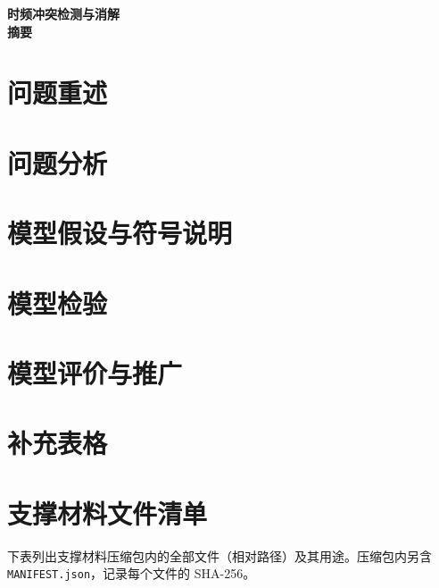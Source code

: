 \documentclass[UTF8,zihao=-4,fontset=none,a4paper]{ctexart}
\theoremstyle{definition}
\begin{document}
\setcounter{page}{1}
\begin{center}
{\LARGE\bfseries\sffamily\color{ink} 时频冲突检测与消解}\\[10pt]
{\large\bfseries 摘\quad 要}
\end{center}

\label{page:abstract-end}
\newpage

\section{问题重述}


\section{问题分析}


\section{模型假设与符号说明}




\section{模型检验}
\label{sec:validation}


\section{模型评价与推广}




\begingroup
\linespread{1.1}\small
{}

\endgroup
\label{page:body-end}

\clearpage
\appendix
\section{补充表格}
\label{app:tables}


\section{支撑材料文件清单}
\label{app:support}
下表列出支撑材料压缩包内的全部文件（相对路径）及其用途。压缩包内另含 \nolinkurl{MANIFEST.json}，记录每个文件的 SHA-256。

\end{document}
